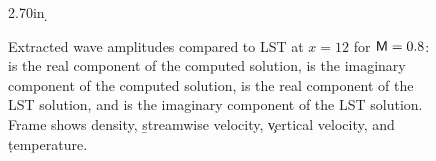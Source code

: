 \begin{figure}[p]
\centering
\figlab 4.0in 2.70in {\d} 
\epsfxsize=4.5in
\caption [Extracted wave amplitudes compared to LST at $x=12$ for
$\M=0.8$.]{Extracted wave amplitudes compared to LST at $x=12$ for $\M=0.8$:
\solid is the real component of the computed solution, \ldashed is the
imaginary component of the computed solution, \dashed is the real component of
the LST solution, and \dotted is the imaginary component of the LST
solution. Frame \a shows density, \b streamwise velocity, \c vertical
velocity, and \d temperature.
\label{mheig} }
\end{figure}

